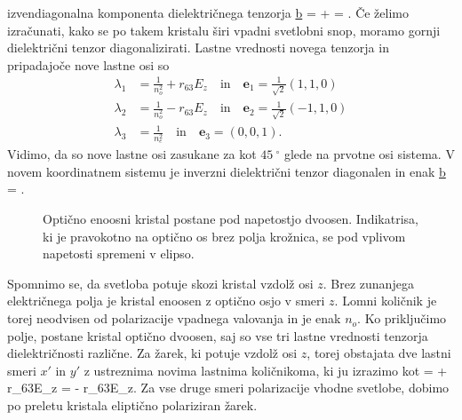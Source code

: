 izvendiagonalna komponenta dielektričnega tenzorja 
\beq
\underline{b} = 
 +  = .
\label{7.8a}
\eeq
Če želimo izračunati, kako se po takem kristalu širi vpadni svetlobni
snop, moramo gornji dielektrični tenzor diagonalizirati. Lastne vrednosti novega tenzorja
in pripadajoče nove lastne osi so
\begin{align}
\lambda_1 &= \frac{1}{n_o^2}+ r_{63}E_z \quad \mathrm{in} \quad \mathbf{e}_1 = \frac{1}{\sqrt{2}}(1,1,0)\\
\lambda_2 &= \frac{1}{n_o^2}- r_{63}E_z \quad \mathrm{in} \quad \mathbf{e}_2 = \frac{1}{\sqrt{2}}(-1,1,0)\\
\lambda_3 &= \frac{1}{n_e^2} \quad \mathrm{in} \quad \mathbf{e}_3 = (0,0,1).
\end{align}
Vidimo, da so nove lastne osi zasukane za kot $45~^\circ$ glede na prvotne osi sistema.
V novem koordinatnem sistemu je inverzni dielektrični tenzor diagonalen in enak
\beq
\underline{b} = 
.
\eeq
\begin{figure}[h]
\centering
\def\svgwidth{60truemm} 

\caption{Optično enoosni kristal postane pod napetostjo dvoosen. Indikatrisa, ki je pravokotno
na optično os brez polja krožnica, se pod vplivom napetosti spremeni v elipso. }
\label{fig:amn}
\end{figure}
Spomnimo se, da svetloba potuje skozi kristal vzdolž osi $z$. Brez zunanjega električnega
polja je kristal enoosen z optično osjo v smeri $z$. Lomni količnik je torej neodvisen od
polarizacije vpadnega valovanja in je enak $n_o$. Ko priključimo polje, postane kristal
optično dvoosen, saj so vse tri lastne vrednosti tenzorja dielektričnosti različne. Za žarek, 
ki potuje vzdolž osi $z$, torej obstajata dve lastni smeri $x'$ in $y'$ z ustreznima
novima lastnima količnikoma, ki ju izrazimo kot
\beq
{} = + r_{63}E_z \quad {} \quad 
{} = - r_{63}E_z. 
\eeq
Za vse druge smeri polarizacije vhodne svetlobe, dobimo po preletu kristala eliptično polariziran žarek.

